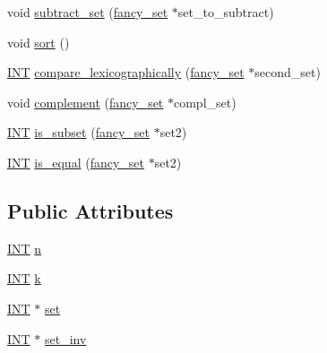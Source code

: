 \begin{DoxyCompactItemize}
\item 
void \mbox{\hyperlink{classfancy__set_a111234826ca45c820fc28c8424cb8093}{subtract\+\_\+set}} (\mbox{\hyperlink{classfancy__set}{fancy\+\_\+set}} $\ast$set\+\_\+to\+\_\+subtract)
\item 
void \mbox{\hyperlink{classfancy__set_aa757da529107b6f0397cafada1423712}{sort}} ()
\item 
\mbox{\hyperlink{galois_8h_a09fddde158a3a20bd2dcadb609de11dc}{I\+NT}} \mbox{\hyperlink{classfancy__set_ad4de00945e560a432a3d5c88ede380eb}{compare\+\_\+lexicographically}} (\mbox{\hyperlink{classfancy__set}{fancy\+\_\+set}} $\ast$second\+\_\+set)
\item 
void \mbox{\hyperlink{classfancy__set_abedc06ae7665734f1ae68f2d6b3d1b43}{complement}} (\mbox{\hyperlink{classfancy__set}{fancy\+\_\+set}} $\ast$compl\+\_\+set)
\item 
\mbox{\hyperlink{galois_8h_a09fddde158a3a20bd2dcadb609de11dc}{I\+NT}} \mbox{\hyperlink{classfancy__set_a98d8b3df4343d59c8aea82da0c223f4f}{is\+\_\+subset}} (\mbox{\hyperlink{classfancy__set}{fancy\+\_\+set}} $\ast$set2)
\item 
\mbox{\hyperlink{galois_8h_a09fddde158a3a20bd2dcadb609de11dc}{I\+NT}} \mbox{\hyperlink{classfancy__set_ac229d24de145977b85a4dbcdd3dfe14a}{is\+\_\+equal}} (\mbox{\hyperlink{classfancy__set}{fancy\+\_\+set}} $\ast$set2)
\end{DoxyCompactItemize}
\subsection*{Public Attributes}
\begin{DoxyCompactItemize}
\item 
\mbox{\hyperlink{galois_8h_a09fddde158a3a20bd2dcadb609de11dc}{I\+NT}} \mbox{\hyperlink{classfancy__set_a25ff45c6332feb9a6a2bff3156b4c814}{n}}
\item 
\mbox{\hyperlink{galois_8h_a09fddde158a3a20bd2dcadb609de11dc}{I\+NT}} \mbox{\hyperlink{classfancy__set_a24542fbd3ff9860949ef8a33ca889c40}{k}}
\item 
\mbox{\hyperlink{galois_8h_a09fddde158a3a20bd2dcadb609de11dc}{I\+NT}} $\ast$ \mbox{\hyperlink{classfancy__set_a8618a1f1cfa6d3359134160ddc476f18}{set}}
\item 
\mbox{\hyperlink{galois_8h_a09fddde158a3a20bd2dcadb609de11dc}{I\+NT}} $\ast$ \mbox{\hyperlink{classfancy__set_a9ed73ce5cd821eeb28fac09d9afcd585}{set\+\_\+inv}}
\end{DoxyCompactItemize}
